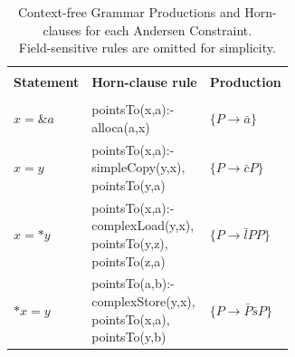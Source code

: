 \begin{table}
    \begin{center}
        \begin{tabularx}{1\textwidth} {X|X|X}
            \hline                                                                   \\
            \textbf{Statement} & \textbf{Horn-clause rule}     & \textbf{Production} \\
            \hline                                                                   \\
            $x = \&a$          & \makecell[cl]{pointsTo(x,a):-                       \\\hspace{1em} alloca(a,x)} & $\{P\rightarrow \bar{a}\}$                          \\\hline
            $x = y$            & \makecell[cl]{pointsTo(x,a):-                       \\\hspace{1em} simpleCopy(y,x),\\\hspace{1em} pointsTo(y,a)} &$\{P\rightarrow \bar{c}P\}$    \\\hline
            $x = *y$           & \makecell[cl]{pointsTo(x,a):-                       \\\hspace{1em} complexLoad(y,x),\\\hspace{1em} pointsTo(y,z),\\\hspace{1em} pointsTo(z,a)}    & $\{P\rightarrow \bar{l}PP\}$                          \\\hline
            $*x = y$           & \makecell[cl]{pointsTo(a,b):-                       \\\hspace{1em} complexStore(y,x),\\\hspace{1em} pointsTo(x,a),\\\hspace{1em} pointsTo(y,b)}   & $\{P\rightarrow \bar{P}\bar{s}P\}$                          \\
        \end{tabularx}
    \end{center}
    \caption[Overview of CFG Productions for Andersen Constraints]{Context-free Grammar Productions and Horn-clauses for each Andersen Constraint.\\Field-sensitive rules are omitted for simplicity.}
    \label{tab:cfl-ander2}
\end{table}
